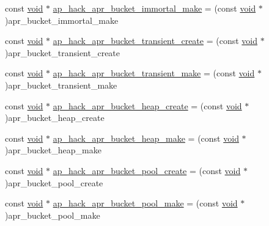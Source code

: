 \begin{DoxyCompactItemize}
\item 
const \hyperlink{group__MOD__ISAPI_gacd6cdbf73df3d9eed42fa493d9b621a6}{void} $\ast$ \hyperlink{srclib_2apr-util_2exports_8c_af298de20fc0c5be66e93463797249b93}{ap\+\_\+hack\+\_\+apr\+\_\+bucket\+\_\+immortal\+\_\+make} = (const \hyperlink{group__MOD__ISAPI_gacd6cdbf73df3d9eed42fa493d9b621a6}{void} $\ast$)apr\+\_\+bucket\+\_\+immortal\+\_\+make
\item 
const \hyperlink{group__MOD__ISAPI_gacd6cdbf73df3d9eed42fa493d9b621a6}{void} $\ast$ \hyperlink{srclib_2apr-util_2exports_8c_aee097e5d8af4f257f83736f154e6d73c}{ap\+\_\+hack\+\_\+apr\+\_\+bucket\+\_\+transient\+\_\+create} = (const \hyperlink{group__MOD__ISAPI_gacd6cdbf73df3d9eed42fa493d9b621a6}{void} $\ast$)apr\+\_\+bucket\+\_\+transient\+\_\+create
\item 
const \hyperlink{group__MOD__ISAPI_gacd6cdbf73df3d9eed42fa493d9b621a6}{void} $\ast$ \hyperlink{srclib_2apr-util_2exports_8c_a799ed672a2698b7570662e36905061e0}{ap\+\_\+hack\+\_\+apr\+\_\+bucket\+\_\+transient\+\_\+make} = (const \hyperlink{group__MOD__ISAPI_gacd6cdbf73df3d9eed42fa493d9b621a6}{void} $\ast$)apr\+\_\+bucket\+\_\+transient\+\_\+make
\item 
const \hyperlink{group__MOD__ISAPI_gacd6cdbf73df3d9eed42fa493d9b621a6}{void} $\ast$ \hyperlink{srclib_2apr-util_2exports_8c_a36f3dfa75ee6e4814a5b3d1fa66c4655}{ap\+\_\+hack\+\_\+apr\+\_\+bucket\+\_\+heap\+\_\+create} = (const \hyperlink{group__MOD__ISAPI_gacd6cdbf73df3d9eed42fa493d9b621a6}{void} $\ast$)apr\+\_\+bucket\+\_\+heap\+\_\+create
\item 
const \hyperlink{group__MOD__ISAPI_gacd6cdbf73df3d9eed42fa493d9b621a6}{void} $\ast$ \hyperlink{srclib_2apr-util_2exports_8c_a5515b40c858c4228d48eff4e5ec0c78f}{ap\+\_\+hack\+\_\+apr\+\_\+bucket\+\_\+heap\+\_\+make} = (const \hyperlink{group__MOD__ISAPI_gacd6cdbf73df3d9eed42fa493d9b621a6}{void} $\ast$)apr\+\_\+bucket\+\_\+heap\+\_\+make
\item 
const \hyperlink{group__MOD__ISAPI_gacd6cdbf73df3d9eed42fa493d9b621a6}{void} $\ast$ \hyperlink{srclib_2apr-util_2exports_8c_a7ffd6fad738f5cb92d8b7a4b2cd6ee63}{ap\+\_\+hack\+\_\+apr\+\_\+bucket\+\_\+pool\+\_\+create} = (const \hyperlink{group__MOD__ISAPI_gacd6cdbf73df3d9eed42fa493d9b621a6}{void} $\ast$)apr\+\_\+bucket\+\_\+pool\+\_\+create
\item 
const \hyperlink{group__MOD__ISAPI_gacd6cdbf73df3d9eed42fa493d9b621a6}{void} $\ast$ \hyperlink{srclib_2apr-util_2exports_8c_a9a884120dcb93a87c80c2fb7bdf78420}{ap\+\_\+hack\+\_\+apr\+\_\+bucket\+\_\+pool\+\_\+make} = (const \hyperlink{group__MOD__ISAPI_gacd6cdbf73df3d9eed42fa493d9b621a6}{void} $\ast$)apr\+\_\+bucket\+\_\+pool\+\_\+make

\end{DoxyCompactItemize}
